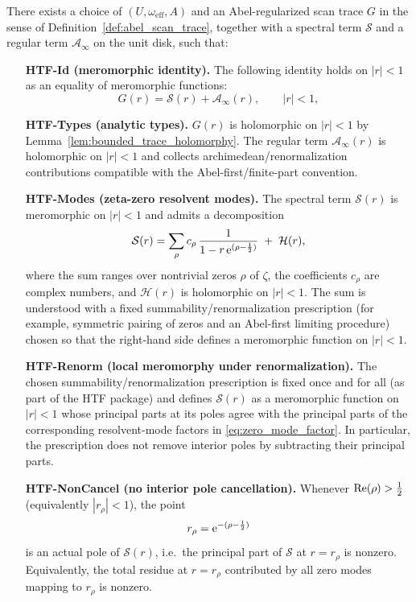 \begin{assumption}
\label{ass:HTF}
There exists a choice of $(U,\omega_{\mathrm{eff}},A)$ and an Abel-regularized scan trace $G$ in the sense of Definition~\ref{def:abel_scan_trace}, together with a spectral term $\mathcal{S}$ and a regular term $\mathcal{A}_\infty$ on the unit disk, such that:
\begin{enumerate}
\item[\textbf{HTF-Id (meromorphic identity).}]
The following identity holds on $|r|<1$ as an equality of meromorphic functions:
\begin{equation}
\label{eq:htf_identity}
G(r)=\mathcal{S}(r)+\mathcal{A}_{\infty}(r),
\qquad |r|<1,
\end{equation}
\item[\textbf{HTF-Types (analytic types).}]
$G(r)$ is holomorphic on $|r|<1$ by Lemma~\ref{lem:bounded_trace_holomorphy}.
The regular term $\mathcal{A}_{\infty}(r)$ is holomorphic on $|r|<1$ and collects archimedean/renormalization contributions compatible with the Abel-first/finite-part convention.
\item[\textbf{HTF-Modes (zeta-zero resolvent modes).}]
The spectral term $\mathcal{S}(r)$ is meromorphic on $|r|<1$ and admits a decomposition
\begin{equation}
\label{eq:zero_mode_factor}
\mathcal{S}(r)=\sum_{\rho} c_\rho\,\frac{1}{1-r\,\mathrm{e}^{(\rho-\frac12)}}\;+\;\mathcal{H}(r),
\end{equation}
where the sum ranges over nontrivial zeros $\rho$ of $\zeta$, the coefficients $c_\rho$ are complex numbers, and $\mathcal{H}(r)$ is holomorphic on $|r|<1$.
The sum is understood with a fixed summability/renormalization prescription (for example, symmetric pairing of zeros and an Abel-first limiting procedure) chosen so that the right-hand side defines a meromorphic function on $|r|<1$.
\item[\textbf{HTF-Renorm (local meromorphy under renormalization).}]
The chosen summability/renormalization prescription is fixed once and for all (as part of the HTF package) and defines $\mathcal{S}(r)$ as a meromorphic function on $|r|<1$ whose principal parts at its poles agree with the principal parts of the corresponding resolvent-mode factors in \eqref{eq:zero_mode_factor}.
In particular, the prescription does not remove interior poles by subtracting their principal parts.
\item[\textbf{HTF-NonCancel (no interior pole cancellation).}]
Whenever $\operatorname{Re}(\rho)>\tfrac12$ (equivalently $|r_\rho|<1$), the point
\[
r_\rho=\mathrm{e}^{-(\rho-\frac12)}
\]
is an actual pole of $\mathcal{S}(r)$, i.e.\ the principal part of $\mathcal{S}$ at $r=r_\rho$ is nonzero.
Equivalently, the total residue at $r=r_\rho$ contributed by all zero modes mapping to $r_\rho$ is nonzero.
\end{enumerate}
\end{assumption}

